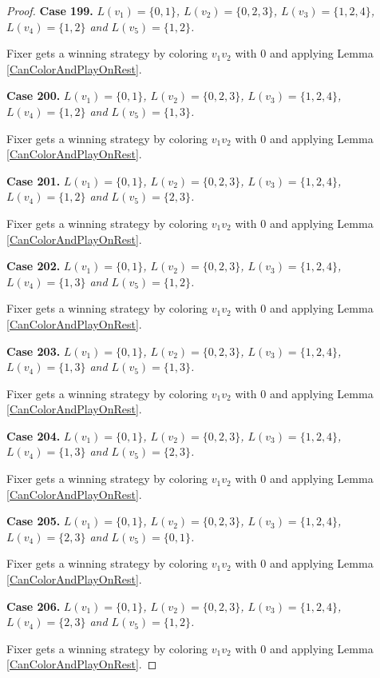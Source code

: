 \documentclass[12pt]{amsart}
\theoremstyle{plain}
\theoremstyle{definition}
\theoremstyle{remark}
\begin{document}
\begin{proof}
\noindent\textbf{Case 199.  }\textit{$L(v_1) = \{0, 1\}$, $L(v_2) = \{0, 2, 3\}$, $L(v_3) = \{1, 2, 4\}$, $L(v_4) = \{1, 2\}$ and $L(v_5) = \{1, 2\}$.}

Fixer gets a winning strategy by coloring $v_1v_2$ with $0$ and applying Lemma \ref{CanColorAndPlayOnRest}.

\noindent\textbf{Case 200.  }\textit{$L(v_1) = \{0, 1\}$, $L(v_2) = \{0, 2, 3\}$, $L(v_3) = \{1, 2, 4\}$, $L(v_4) = \{1, 2\}$ and $L(v_5) = \{1, 3\}$.}

Fixer gets a winning strategy by coloring $v_1v_2$ with $0$ and applying Lemma \ref{CanColorAndPlayOnRest}.

\noindent\textbf{Case 201.  }\textit{$L(v_1) = \{0, 1\}$, $L(v_2) = \{0, 2, 3\}$, $L(v_3) = \{1, 2, 4\}$, $L(v_4) = \{1, 2\}$ and $L(v_5) = \{2, 3\}$.}

Fixer gets a winning strategy by coloring $v_1v_2$ with $0$ and applying Lemma \ref{CanColorAndPlayOnRest}.

\noindent\textbf{Case 202.  }\textit{$L(v_1) = \{0, 1\}$, $L(v_2) = \{0, 2, 3\}$, $L(v_3) = \{1, 2, 4\}$, $L(v_4) = \{1, 3\}$ and $L(v_5) = \{1, 2\}$.}

Fixer gets a winning strategy by coloring $v_1v_2$ with $0$ and applying Lemma \ref{CanColorAndPlayOnRest}.

\noindent\textbf{Case 203.  }\textit{$L(v_1) = \{0, 1\}$, $L(v_2) = \{0, 2, 3\}$, $L(v_3) = \{1, 2, 4\}$, $L(v_4) = \{1, 3\}$ and $L(v_5) = \{1, 3\}$.}

Fixer gets a winning strategy by coloring $v_1v_2$ with $0$ and applying Lemma \ref{CanColorAndPlayOnRest}.

\noindent\textbf{Case 204.  }\textit{$L(v_1) = \{0, 1\}$, $L(v_2) = \{0, 2, 3\}$, $L(v_3) = \{1, 2, 4\}$, $L(v_4) = \{1, 3\}$ and $L(v_5) = \{2, 3\}$.}

Fixer gets a winning strategy by coloring $v_1v_2$ with $0$ and applying Lemma \ref{CanColorAndPlayOnRest}.

\noindent\textbf{Case 205.  }\textit{$L(v_1) = \{0, 1\}$, $L(v_2) = \{0, 2, 3\}$, $L(v_3) = \{1, 2, 4\}$, $L(v_4) = \{2, 3\}$ and $L(v_5) = \{0, 1\}$.}

Fixer gets a winning strategy by coloring $v_1v_2$ with $0$ and applying Lemma \ref{CanColorAndPlayOnRest}.

\noindent\textbf{Case 206.  }\textit{$L(v_1) = \{0, 1\}$, $L(v_2) = \{0, 2, 3\}$, $L(v_3) = \{1, 2, 4\}$, $L(v_4) = \{2, 3\}$ and $L(v_5) = \{1, 2\}$.}

Fixer gets a winning strategy by coloring $v_1v_2$ with $0$ and applying Lemma \ref{CanColorAndPlayOnRest}.


\end{proof}
\end{document}
